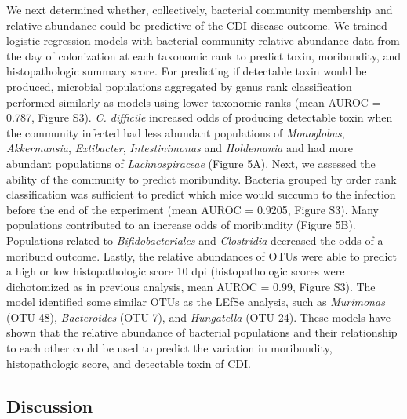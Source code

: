 \documentclass[
  12pt,
]{article}
\begin{document}
We next determined whether, collectively, bacterial community membership
and relative abundance could be predictive of the CDI disease outcome.
We trained logistic regression models with bacterial community relative
abundance data from the day of colonization at each taxonomic rank to
predict toxin, moribundity, and histopathologic summary score. For
predicting if detectable toxin would be produced, microbial populations
aggregated by genus rank classification performed similarly as models
using lower taxonomic ranks (mean AUROC = 0.787, Figure S3). \emph{C.
difficile} increased odds of producing detectable toxin when the
community infected had less abundant populations of \emph{Monoglobus},
\emph{Akkermansia}, \emph{Extibacter}, \emph{Intestinimonas} and
\emph{Holdemania} and had more abundant populations of
\emph{Lachnospiraceae} (Figure 5A). Next, we assessed the ability of the
community to predict moribundity. Bacteria grouped by order rank
classification was sufficient to predict which mice would succumb to the
infection before the end of the experiment (mean AUROC = 0.9205, Figure
S3). Many populations contributed to an increase odds of moribundity
(Figure 5B). Populations related to \emph{Bifidobacteriales} and
\emph{Clostridia} decreased the odds of a moribund outcome. Lastly, the
relative abundances of OTUs were able to predict a high or low
histopathologic score 10 dpi (histopathologic scores were dichotomized
as in previous analysis, mean AUROC = 0.99, Figure S3). The model
identified some similar OTUs as the LEfSe analysis, such as
\emph{Murimonas} (OTU 48), \emph{Bacteroides} (OTU 7), and
\emph{Hungatella} (OTU 24). These models have shown that the relative
abundance of bacterial populations and their relationship to each other
could be used to predict the variation in moribundity, histopathologic
score, and detectable toxin of CDI.

\hypertarget{discussion}{%
\subsection{Discussion}\label{discussion}}
\end{document}
